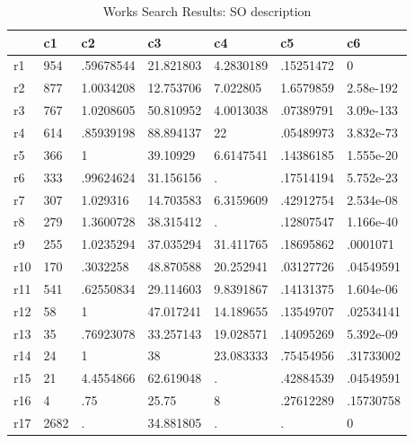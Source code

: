 \begin{table}[htbp]
\caption{\label{clabel} Works Search Results: SO description}\centering\medskip
\begin{tabular}{|l|l|l|l|l|l|l|}\hline  
 & c1  & c2  & c3  & c4  & c5  & c6  \\ \hline  
r1 & 954 & .59678544 & 21.821803 & 4.2830189 & .15251472 & 0 \\ \hline 
r2 & 877 & 1.0034208 & 12.753706 & 7.022805 & 1.6579859 & 2.58e-192 \\ \hline 
r3 & 767 & 1.0208605 & 50.810952 & 4.0013038 & .07389791 & 3.09e-133 \\ \hline 
r4 & 614 & .85939198 & 88.894137 & 22 & .05489973 & 3.832e-73 \\ \hline 
r5 & 366 & 1 & 39.10929 & 6.6147541 & .14386185 & 1.555e-20 \\ \hline 
r6 & 333 & .99624624 & 31.156156 & . & .17514194 & 5.752e-23 \\ \hline 
r7 & 307 & 1.029316 & 14.703583 & 6.3159609 & .42912754 & 2.534e-08 \\ \hline 
r8 & 279 & 1.3600728 & 38.315412 & . & .12807547 & 1.166e-40 \\ \hline 
r9 & 255 & 1.0235294 & 37.035294 & 31.411765 & .18695862 & .0001071 \\ \hline 
r10 & 170 & .3032258 & 48.870588 & 20.252941 & .03127726 & .04549591 \\ \hline 
r11 & 541 & .62550834 & 29.114603 & 9.8391867 & .14131375 & 1.604e-06 \\ \hline 
r12 & 58 & 1 & 47.017241 & 14.189655 & .13549707 & .02534141 \\ \hline 
r13 & 35 & .76923078 & 33.257143 & 19.028571 & .14095269 & 5.392e-09 \\ \hline 
r14 & 24 & 1 & 38 & 23.083333 & .75454956 & .31733002 \\ \hline 
r15 & 21 & 4.4554866 & 62.619048 & . & .42884539 & .04549591 \\ \hline 
r16 & 4 & .75 & 25.75 & 8 & .27612289 & .15730758 \\ \hline 
r17 & 2682 & . & 34.881805 & . & . & 0 \\ \hline 
  \end{tabular}
\end{table}
